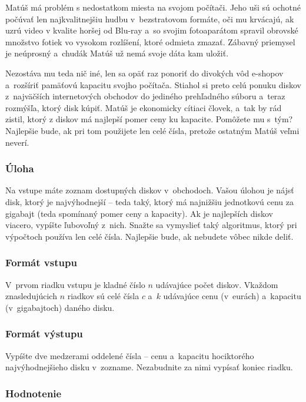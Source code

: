 Matúš má problém s nedostatkom miesta na svojom počítači. Jeho uši sú ochotné počúvať len najkvalitnejšiu
hudbu v~bezstratovom formáte, oči mu krvácajú, ak uzrú video v kvalite horšej od Blu-ray a~so svojim
fotoaparátom spravil obrovské množstvo fotiek vo vysokom rozlíšení, ktoré odmieta zmazať. Zábavný priemysel
je neúprosný a~chudák Matúš už nemá svoje dáta kam uložiť.

Nezostáva mu teda nič iné, len sa opäť raz ponoriť do divokých vôd e-shopov a~rozšíriť pamäťovú kapacitu svojho počítača.
Stiahol si preto celú ponuku diskov z~najväčších internetových obchodov do jediného prehľadného súboru
a~teraz rozmýšľa, ktorý disk kúpiť. Matúš je ekonomicky cítiaci človek, a~tak by rád zistil, ktorý z diskov má najlepší pomer ceny ku kapacite.
Pomôžete mu s~tým? Najlepšie bude, ak pri tom použijete len celé čísla, pretože ostatným Matúš veľmi neverí.

\subsubsection{Úloha}

Na vstupe máte zoznam dostupných diskov v~obchodoch. Vašou úlohou je nájsť disk, ktorý je najvýhodnejší -- teda taký,
ktorý má najnižšiu jednotkovú cenu za gigabajt (teda spomínaný pomer ceny a kapacity).
Ak je najlepších diskov viacero, vypíšte ľubovoľný z~nich. Snažte sa vymyslieť taký algoritmus, ktorý pri výpočtoch
používa len celé čísla. Najlepšie bude, ak nebudete vôbec nikde deliť.

\subsubsection{Formát vstupu}

V~prvom riadku vstupu je kladné číslo $n$ udávajúce počet diskov.
Vkaždom znasledujúcich $n$ riadkov sú celé čísla $c$ a~$k$ udávajúce cenu (v~eurách)
a~kapacitu (v~gigabajtoch) daného disku.

\subsubsection{Formát výstupu}

Vypíšte dve medzerami oddelené čísla -- cenu a~kapacitu hociktorého najvýhodnejšieho disku v~zozname.
Nezabudnite za nimi vypísať koniec riadku.

\subsubsection{Hodnotenie}

